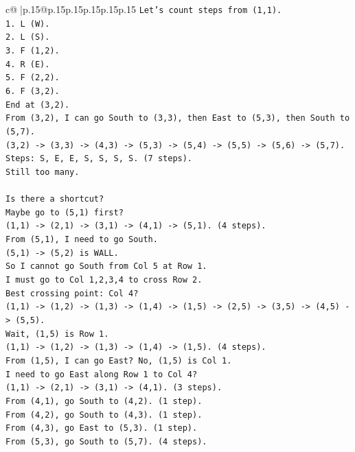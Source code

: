 \documentclass{article}
\begin{document}
{\begin{supertabular}{c@{$\;$}|p{.15\linewidth}@{}p{.15\linewidth}p{.15\linewidth}p{.15\linewidth}p{.15\linewidth}p{.15\linewidth}}
{{{\texttt{Let's count steps from (1,1).} \\
\texttt{1. L (W).} \\
\texttt{2. L (S).} \\
\texttt{3. F (1,2).} \\
\texttt{4. R (E).} \\
\texttt{5. F (2,2).} \\
\texttt{6. F (3,2).} \\
\texttt{End at (3,2).} \\
\texttt{From (3,2), I can go South to (3,3), then East to (5,3), then South to (5,7).} \\
\texttt{(3,2) {-}> (3,3) {-}> (4,3) {-}> (5,3) {-}> (5,4) {-}> (5,5) {-}> (5,6) {-}> (5,7).} \\
\texttt{Steps: S, E, E, S, S, S, S. (7 steps).} \\
\texttt{Still too many.} \\
\\ 
\texttt{Is there a shortcut?} \\
\texttt{Maybe go to (5,1) first?} \\
\texttt{(1,1) {-}> (2,1) {-}> (3,1) {-}> (4,1) {-}> (5,1). (4 steps).} \\
\texttt{From (5,1), I need to go South.} \\
\texttt{(5,1) {-}> (5,2) is WALL.} \\
\texttt{So I cannot go South from Col 5 at Row 1.} \\
\texttt{I must go to Col 1,2,3,4 to cross Row 2.} \\
\texttt{Best crossing point: Col 4?} \\
\texttt{(1,1) {-}> (1,2) {-}> (1,3) {-}> (1,4) {-}> (1,5) {-}> (2,5) {-}> (3,5) {-}> (4,5) {-}> (5,5).} \\
\texttt{Wait, (1,5) is Row 1.} \\
\texttt{(1,1) {-}> (1,2) {-}> (1,3) {-}> (1,4) {-}> (1,5). (4 steps).} \\
\texttt{From (1,5), I can go East? No, (1,5) is Col 1.} \\
\texttt{I need to go East along Row 1 to Col 4?} \\
\texttt{(1,1) {-}> (2,1) {-}> (3,1) {-}> (4,1). (3 steps).} \\
\texttt{From (4,1), go South to (4,2). (1 step).} \\
\texttt{From (4,2), go South to (4,3). (1 step).} \\
\texttt{From (4,3), go East to (5,3). (1 step).} \\
\texttt{From (5,3), go South to (5,7). (4 steps).} \\
}}}
\end{supertabular}}
\end{document}
